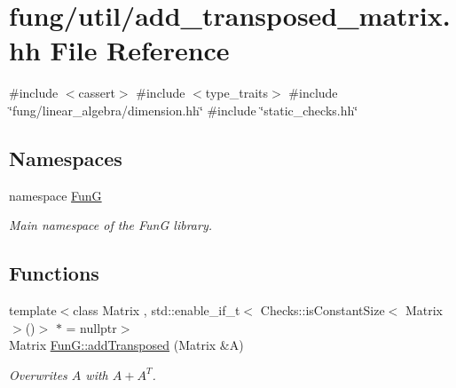\hypertarget{add__transposed__matrix_8hh}{\section{fung/util/add\-\_\-transposed\-\_\-matrix.hh \-File \-Reference}
\label{add__transposed__matrix_8hh}
}
{\ttfamily \#include $<$cassert$>$}\*
{\ttfamily \#include $<$type\-\_\-traits$>$}\*
{\ttfamily \#include \char`\"{}fung/linear\-\_\-algebra/dimension.\-hh\char`\"{}}\*
{\ttfamily \#include \char`\"{}static\-\_\-checks.\-hh\char`\"{}}\*
\subsection*{\-Namespaces}
\begin{DoxyCompactItemize}
\item 
namespace \hyperlink{namespaceFunG}{\-Fun\-G}
\begin{DoxyCompactList}\small\item\em \-Main namespace of the \-Fun\-G library. \end{DoxyCompactList}\end{DoxyCompactItemize}
\subsection*{\-Functions}
\begin{DoxyCompactItemize}
\item 
{\footnotesize template$<$class Matrix , std\-::enable\-\_\-if\-\_\-t$<$ Checks\-::is\-Constant\-Size$<$ Matrix $>$()$>$ $\ast$  = nullptr$>$ }\\\-Matrix \hyperlink{namespaceFunG_a0211d0d26c669d56b5113fd2292902e5}{\-Fun\-G\-::add\-Transposed} (\-Matrix \&\-A)
\begin{DoxyCompactList}\small\item\em \-Overwrites $A$ with $A+A^T$. \end{DoxyCompactList}\end{DoxyCompactItemize}
